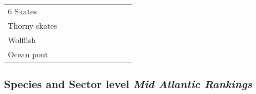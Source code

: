 \documentclass[11pt,]{article}
\begin{document}
\begin{table}[H]
{\begin{tabular}{llllllllll}
6 Skates & \multicolumn{1}{c}{\cellcolor{red}{\textcolor{gray}{h}}} & \multicolumn{1}{c}{\cellcolor{green}{\textcolor{gray}{l}}} & \multicolumn{1}{c}{\cellcolor{green}{\textcolor{gray}{l}}} & \multicolumn{1}{c}{\cellcolor{green}{\textcolor{gray}{l}}} & \multicolumn{1}{c}{\cellcolor{green}{\textcolor{gray}{l}}} & \multicolumn{1}{c}{\cellcolor{green}{\textcolor{gray}{l}}} & \multicolumn{1}{c}{\cellcolor{yellow}{\textcolor{gray}{lm}}} & \multicolumn{1}{c}{\cellcolor{orange}{\textcolor{gray}{mh}}} & \multicolumn{1}{c}{\cellcolor{green}{\textcolor{gray}{l}}}\\
Thorny skates & \multicolumn{1}{c}{\cellcolor{red}{\textcolor{gray}{h}}} & \multicolumn{1}{c}{\cellcolor{green}{\textcolor{gray}{l}}} & \multicolumn{1}{c}{\cellcolor{red}{\textcolor{gray}{h}}} & \multicolumn{1}{c}{\cellcolor{green}{\textcolor{gray}{l}}} & \multicolumn{1}{c}{\cellcolor{green}{\textcolor{gray}{l}}} & \multicolumn{1}{c}{\cellcolor{green}{\textcolor{gray}{l}}} & \multicolumn{1}{c}{\cellcolor{orange}{\textcolor{gray}{mh}}} & \multicolumn{1}{c}{\cellcolor{orange}{\textcolor{gray}{mh}}} & \multicolumn{1}{c}{\cellcolor{green}{\textcolor{gray}{l}}}\\
Wolffish & \multicolumn{1}{c}{\cellcolor{white}{\textcolor{gray}{na}}} & \multicolumn{1}{c}{\cellcolor{green}{\textcolor{gray}{l}}} & \multicolumn{1}{c}{\cellcolor{red}{\textcolor{gray}{h}}} & \multicolumn{1}{c}{\cellcolor{green}{\textcolor{gray}{l}}} & \multicolumn{1}{c}{\cellcolor{green}{\textcolor{gray}{l}}} & \multicolumn{1}{c}{\cellcolor{green}{\textcolor{gray}{l}}} & \multicolumn{1}{c}{\cellcolor{green}{\textcolor{gray}{l}}} & \multicolumn{1}{c}{\cellcolor{orange}{\textcolor{gray}{mh}}} & \multicolumn{1}{c}{\cellcolor{green}{\textcolor{gray}{l}}}\\
Ocean pout & \multicolumn{1}{c}{\cellcolor{white}{\textcolor{gray}{na}}} & \multicolumn{1}{c}{\cellcolor{green}{\textcolor{gray}{l}}} & \multicolumn{1}{c}{\cellcolor{red}{\textcolor{gray}{h}}} & \multicolumn{1}{c}{\cellcolor{green}{\textcolor{gray}{l}}} & \multicolumn{1}{c}{\cellcolor{green}{\textcolor{gray}{l}}} & \multicolumn{1}{c}{\cellcolor{green}{\textcolor{gray}{l}}} & \multicolumn{1}{c}{\cellcolor{orange}{\textcolor{gray}{mh}}} & \multicolumn{1}{c}{\cellcolor{yellow}{\textcolor{gray}{lm}}} & \multicolumn{1}{c}{\cellcolor{green}{\textcolor{gray}{l}}}\\
\bottomrule
\end{tabular}}
\end{table}

\subsection{\texorpdfstring{Species and Sector level \emph{Mid Atlantic
Rankings}}{Species and Sector level Mid Atlantic Rankings}}\label{species-and-sector-level-mid-atlantic-rankings}
\end{document}
